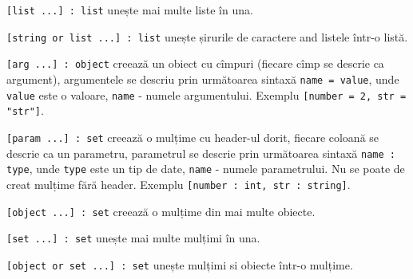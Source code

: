 \texttt{[list ...] : list} unește mai multe liste în una.

\texttt{[string or list ...] : list} unește șirurile de caractere and listele într-o listă.

\texttt{[arg ...] : object} creează un obiect cu cîmpuri (fiecare cîmp se descrie ca argument), argumentele se descriu prin următoarea sintaxă \texttt{name = value}, unde \texttt{value} este o valoare, \texttt{name} - numele argumentului. Exemplu \texttt{[number = 2, str = "str"]}.

\texttt{[param ...] : set} creează o mulțime cu header-ul dorit, fiecare coloană se descrie ca un parametru, parametrul se descrie prin următoarea sintaxă \texttt{name : type}, unde \texttt{type} este un tip de date, \texttt{name} - numele parametrului. Nu se poate de creat mulțime fără header. Exemplu \texttt{[number : int, str : string]}.

\texttt{[object ...] : set} creează o mulțime din mai multe obiecte.

\texttt{[set ...] : set} unește mai multe mulțimi în una.

\texttt{[object or set ...] : set} unește mulțimi si obiecte într-o mulțime.

